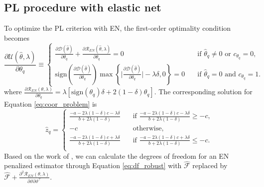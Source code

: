 \documentclass[nojss]{jss}
\begin{document}
\begin{appendix}
\section{PL procedure with elastic net} \label{app:en_algorithm}
To optimize the PL criterion with EN, the first-order optimality condition becomes
%
\begin{equation} \label{eq:optimality_en}
\frac{\partial \mathcal{U}(\hat{\theta}, \lambda)}{\partial \theta_q} \equiv
  \begin{cases}
  \frac{\partial \mathcal{D}(\hat{\theta})}{\partial \theta_q} + \frac{\partial \mathcal{R}_{EN}(\hat{\theta}, \lambda)}{\partial \theta_q}=0 & \quad \text{if }\hat{\theta}_q \neq 0 \text{ or } c_{\theta_q}=0, \\
    \mathrm{sign}(\frac{\partial \mathcal{D}(\hat{\theta})}{\partial \theta_q}) \max \left\{ \big |\frac{\partial \mathcal{D}(\hat{\theta})}{\partial \theta_q} \big | - \lambda \delta, 0 \right\}=0 & \quad \text{if }\hat{\theta}_q = 0 \text{ and } c_{\theta_q}=1. 
  \end{cases}
\end{equation}
%
where $\frac{\partial \mathcal{R}_{EN}(\theta, \lambda)}{\partial \theta_q} = \lambda \left[\mathrm{sign} (\theta_q) \delta + 2 (1-\delta) \theta_q \right] $. The corresponding solution for Equation \ref{eq:coor_problem} is
%
\begin{equation} \label{eq:coor_solution_en}
\hat{z}_q =
\begin{cases}
\frac{ -a -2\lambda(1-\delta)c -\lambda \delta}{b + 2 \lambda (1-\delta)}  & \quad \text{if }  \frac{ -a -2\lambda(1-\delta)c -\lambda \delta}{b + 2 \lambda (1-\delta)}  \geq -c, \\
-c  & \quad \text{otherwise,}  \\
\frac{-a - 2 \lambda (1-\delta) c + \lambda \delta}{b+2 \lambda(1-\delta)}  & \quad \text{if }  \frac{-a - 2 \lambda (1-\delta) c + \lambda \delta}{b+2 \lambda(1-\delta)} \leq -c. \\
  \end{cases}
\end{equation}
%
Based on the work of \cite{tibshirani2012}, we can calculate the degrees of freedom for an EN penalized estimator through Equation \ref{eq:df_robust} with $\widehat{\mathcal{F}}$ replaced by $\widehat{\mathcal{F}} + \frac{\partial^2 \mathcal{R}_{EN}(\theta, \lambda)}{\partial \vartheta \partial \vartheta^\top} $.


\end{appendix}
\end{document}
